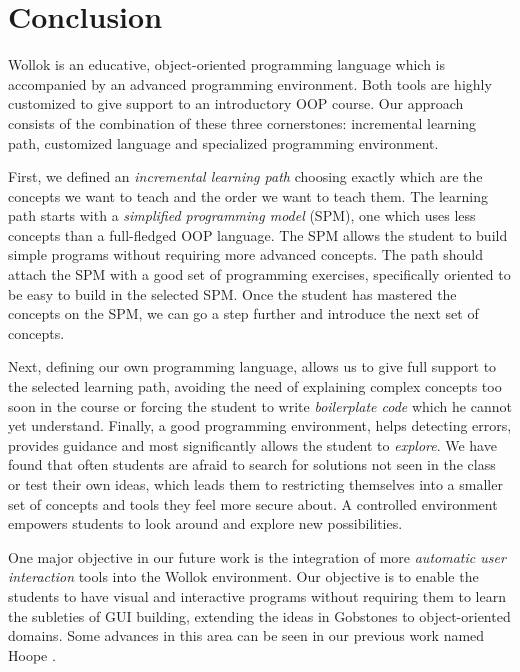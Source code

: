 \section{Conclusion}
\label{sec:conclusion}


Wollok is an educative, object-oriented programming language which is accompanied by an advanced programming environment.
Both tools are highly customized to give support to an introductory OOP course.
Our approach consists of the combination of these three cornerstones: incremental learning path, customized language and specialized programming environment.

First, we defined an \emph{incremental learning path} choosing exactly which are the concepts we want to teach and the order we want to teach them.
The learning path starts with a \emph{simplified programming model} (SPM), \ie one which uses less concepts than a full-fledged OOP language.
The SPM allows the student to build simple programs without requiring more advanced concepts.
The path should attach the SPM with a good set of programming exercises, specifically oriented to be easy to build in the selected SPM.
Once the student has mastered the concepts on the SPM, we can go a step further and introduce the next set of concepts.

Next, defining our own programming language, allows us to give full support to the selected learning path, 
avoiding the need of explaining complex concepts too soon in the course or forcing the student to write \emph{boilerplate code} which he cannot yet understand.
Finally, a good programming environment, helps detecting errors, provides guidance and most significantly allows the student to \emph{explore}.
We have found that often students are afraid to search for solutions not seen in the class or test their own ideas, 
which leads them to restricting themselves into a smaller set of concepts and tools they feel more secure about.
A controlled environment empowers students to look around and explore new possibilities.

\medskip

\label{sec:furtherWork}
One major objective in our future work is the integration of more \emph{automatic user interaction} tools into the Wollok environment.
Our objective is to enable the students to have visual and interactive programs without requiring them to learn the subleties of GUI building, 
extending the ideas in Gobstones \cite{lopez_nombre_2012} to object-oriented domains.
Some advances in this area can be seen in our previous work named Hoope \cite{estefania_miguel_hoope_2013}.

